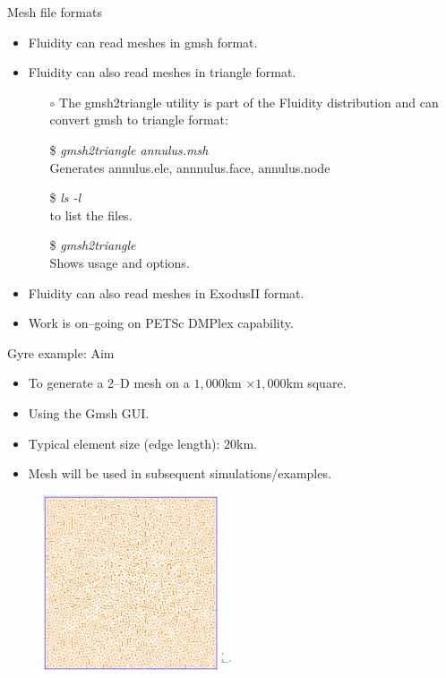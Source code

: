 \documentclass[t]{beamer}
\begin{document}
\begin{frame}{Mesh file formats}
   \begin{itemize}
      \item Fluidity can read meshes in gmsh format.\vspace{10pt}
      \item Fluidity can also read meshes in triangle format.
      \begin{itemize}
         \item[$\circ$] The gmsh2triangle utility is part of the Fluidity distribution and can convert gmsh to triangle format:
         \item[\$] \emph{gmsh2triangle annulus.msh} \\ \hspace{10pt} Generates annulus.ele, annnulus.face, annulus.node
         \item[\$] \emph{ls -l} \\ \hspace{10pt} to list the files.
         \item[\$] \emph{gmsh2triangle} \\ \hspace{10pt} Shows usage and options.\vspace{10pt}
      \end{itemize}
      \item Fluidity can also read meshes in ExodusII format.\vspace{10pt}
      \item Work is on--going on PETSc DMPlex capability.
   \end{itemize}
\end{frame}

\begin{frame}{Gyre example: Aim}

\begin{itemize}
    \item To generate a 2--D mesh on a $1,000$km $\times 1,000$km square.
    \item Using the Gmsh GUI.
    \item Typical element size (edge length): $20$km.
    \item Mesh will be used in subsequent simulations/examples.
\end{itemize}

\begin{figure}[htbp]
 \centering
  \includegraphics[width=0.5\textwidth]{../figures/2d-example-mesh}
\end{figure}

\end{frame}
\end{document}
